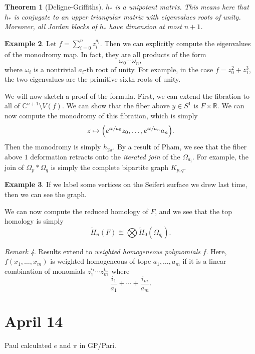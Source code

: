 \documentclass[leqno, openany]{memoir}
\newtheorem{thm}{Theorem}[chapter]
\theoremstyle{definition}
\newtheorem{exm}[thm]{Example}
\theoremstyle{remark}
\newtheorem{rmk}[thm]{Remark}
\theoremstyle{plain}
\theoremstyle{definition}
\theoremstyle{remark}
\newcommand{\R}{\mathbb{R}}
\renewcommand{\C}{\mathbb{C}}
\begin{document}
\begin{thm}[Deligne-Griffiths]
    $h_*$ is a unipotent matrix. This means here that $h_*$ is conjugate to an upper triangular matrix with eigenvalues roots of unity. Moreover, all Jordan blocks of $h_*$ have dimension at most $n+1$.
\end{thm}

\begin{exm}
    Let $f = \sum_{i=0}^n z_i^{a_i}$. Then we can explicitly compute the eigenvalues of the monodromy map. In fact, they are all products of the form
    \[ \omega_0 \cdots \omega_n, \]
    where $\omega_i$ is a nontrivial $a_i$-th root of unity. For example, in the case $f = z_0^2 + z_1^3$, the two eigenvalues are the primitive sixth roots of unity.
\end{exm}

We will now sketch a proof of the formula. First, we can extend the fibration to all of $\C^{n+1} \setminus V(f)$. We can show that the fiber above $y \in S^1$ is $F \times \R$. We can now compute the monodromy of this fibration, which is simply
\[ z \mapsto \qty(e^{it/a_0} z_0, \ldots, e^{it/a_n} a_n). \]
Then the monodromy is simply $h_{2\pi}$. By a result of Pham, we see that
the fiber above $1$ deformation retracts onto the \textit{iterated join} of the $\Omega_{a_i}$. For example, the join of $\Omega_p * \Omega_q$ is simply the complete bipartite graph $K_{p,q}$.

\begin{exm}
    If we label some vertices on the Seifert surface we drew last time, then we can see the graph.
\end{exm}

We can now compute the reduced homology of $F$, and we see that the top homology is simply 
\[ \widetilde{H}_n(F) \cong \bigotimes \widetilde{H}_0(\Omega_{q_i}). \] 

\begin{rmk}
    Results extend to \textit{weighted homogeneous polynomials} $f$. Here, $f(x_1, \ldots, x_m)$ is weighted homogeneous of tope $a_1, \ldots, a_m$ if it is a linear combination of monomials $z_1^{i_1} \cdots z_m^{i_m}$ where
    \[ \frac{i_1}{a_1} + \cdots + \frac{i_m}{a_m}. \]  
\end{rmk}

\chapter{April 14}%
\label{cha:april_14}

Paul calculated $e$ and $\pi$ in GP/Pari.
\end{document}

